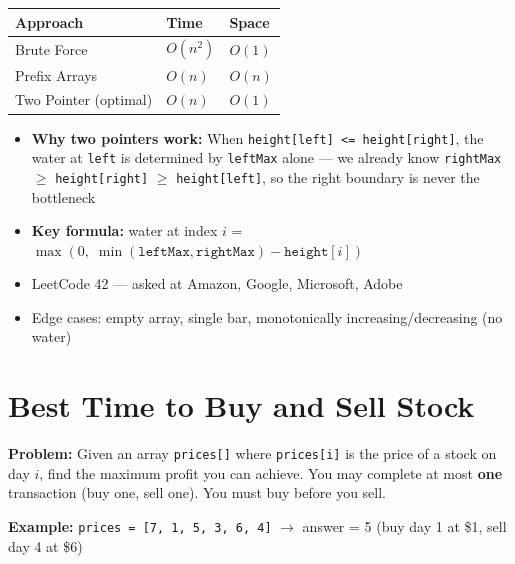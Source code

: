 \documentclass[12pt,a4paper,oneside]{book}
\begin{document}
\begin{complexity}
\begin{center}
\begin{tabular}{lll}
\toprule
\textbf{Approach} & \textbf{Time} & \textbf{Space}\\
\midrule
Brute Force              & $O(n^2)$  & $O(1)$\\
Prefix Arrays            & $O(n)$    & $O(n)$\\
Two Pointer (optimal)    & $O(n)$    & $O(1)$\\
\bottomrule
\end{tabular}
\end{center}
\end{complexity}

\begin{interviewcorner}
\begin{itemize}
  \item \textbf{Why two pointers work:} When \texttt{height[left] <= height[right]}, the water at \texttt{left} is determined by \texttt{leftMax} alone --- we already know \texttt{rightMax} $\geq$ \texttt{height[right]} $\geq$ \texttt{height[left]}, so the right boundary is never the bottleneck
  \item \textbf{Key formula:} water at index $i$ = $\max(0,\; \min(\texttt{leftMax}, \texttt{rightMax}) - \texttt{height}[i])$
  \item LeetCode 42 --- asked at Amazon, Google, Microsoft, Adobe
  \item Edge cases: empty array, single bar, monotonically increasing/decreasing (no water)
\end{itemize}
\end{interviewcorner}

\section{Best Time to Buy and Sell Stock}

\textbf{Problem:} Given an array \texttt{prices[]} where \texttt{prices[i]} is the price of a stock on day $i$, find the maximum profit you can achieve. You may complete at most \textbf{one} transaction (buy one, sell one). You must buy before you sell.

\textbf{Example:} \texttt{prices = [7, 1, 5, 3, 6, 4]} $\to$ answer = 5 (buy day 1 at \$1, sell day 4 at \$6)
\end{document}
